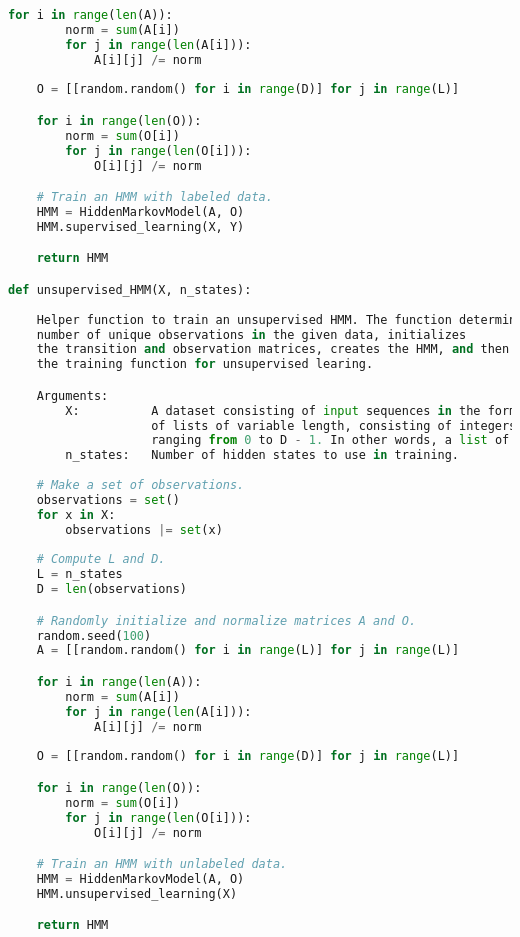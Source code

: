 \begin{lstlisting}[language=Python]
    for i in range(len(A)):
        norm = sum(A[i])
        for j in range(len(A[i])):
            A[i][j] /= norm
    
    O = [[random.random() for i in range(D)] for j in range(L)]

    for i in range(len(O)):
        norm = sum(O[i])
        for j in range(len(O[i])):
            O[i][j] /= norm

    # Train an HMM with labeled data.
    HMM = HiddenMarkovModel(A, O)
    HMM.supervised_learning(X, Y)

    return HMM

def unsupervised_HMM(X, n_states):
    
    Helper function to train an unsupervised HMM. The function determines the
    number of unique observations in the given data, initializes
    the transition and observation matrices, creates the HMM, and then runs
    the training function for unsupervised learing.

    Arguments:
        X:          A dataset consisting of input sequences in the form
                    of lists of variable length, consisting of integers 
                    ranging from 0 to D - 1. In other words, a list of lists.
        n_states:   Number of hidden states to use in training.
    
    # Make a set of observations.
    observations = set()
    for x in X:
        observations |= set(x)
    
    # Compute L and D.
    L = n_states
    D = len(observations)

    # Randomly initialize and normalize matrices A and O.
    random.seed(100)
    A = [[random.random() for i in range(L)] for j in range(L)]

    for i in range(len(A)):
        norm = sum(A[i])
        for j in range(len(A[i])):
            A[i][j] /= norm
    
    O = [[random.random() for i in range(D)] for j in range(L)]

    for i in range(len(O)):
        norm = sum(O[i])
        for j in range(len(O[i])):
            O[i][j] /= norm

    # Train an HMM with unlabeled data.
    HMM = HiddenMarkovModel(A, O)
    HMM.unsupervised_learning(X)

    return HMM
\end{lstlisting}


